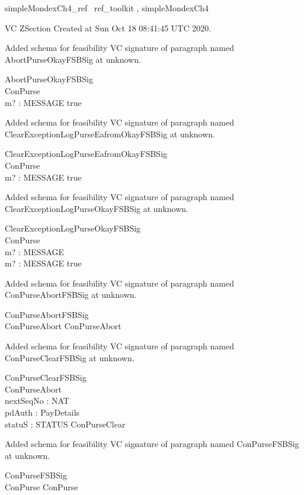\documentclass{article}
\begin{document}

\begin{zsection}	 \SECTION simpleMondexCh4\_ref \parents~ref\_toolkit , simpleMondexCh4
\end{zsection}

VC ZSection Created at Sun Oct 18 08:41:45 UTC 2020.


Added schema for feasibility VC signature of paragraph named AbortPurseOkayFSBSig at unknown.
\begin{schema}{AbortPurseOkayFSBSig}
\\
 ConPurse \\
 m? : MESSAGE 
\where
 true
\end{schema}


Added schema for feasibility VC signature of paragraph named ClearExceptionLogPurseEafromOkayFSBSig at unknown.
\begin{schema}{ClearExceptionLogPurseEafromOkayFSBSig}
\\
 ConPurse \\
 m? : MESSAGE 
\where
 true
\end{schema}


Added schema for feasibility VC signature of paragraph named ClearExceptionLogPurseOkayFSBSig at unknown.
\begin{schema}{ClearExceptionLogPurseOkayFSBSig}
\\
 ConPurse \\
 m? : MESSAGE \\
 m? : MESSAGE 
\where
 true
\end{schema}


Added schema for feasibility VC signature of paragraph named ConPurseAbortFSBSig at unknown.
\begin{schema}{ConPurseAbortFSBSig}
\\
 ConPurseAbort 
\where
 ConPurseAbort
\end{schema}


Added schema for feasibility VC signature of paragraph named ConPurseClearFSBSig at unknown.
\begin{schema}{ConPurseClearFSBSig}
\\
 ConPurseAbort \\
 nextSeqNo : NAT \\
 pdAuth : PayDetails \\
 statuS : STATUS 
\where
 ConPurseClear
\end{schema}


Added schema for feasibility VC signature of paragraph named ConPurseFSBSig at unknown.
\begin{schema}{ConPurseFSBSig}
\\
 ConPurse 
\where
 ConPurse
\end{schema}
\end{document}
